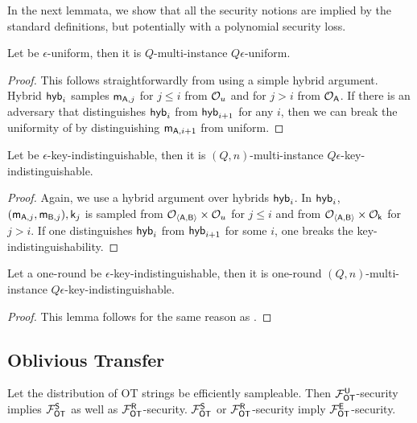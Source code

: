 In the next lemmata, we show that all the security notions are implied by the standard definitions, but potentially with a polynomial security loss.
 
\begin{lemma}\label{lem:multuniform}
Let \UKA be $\epsilon$-uniform, then it is $Q$-multi-instance $Q\epsilon$-uniform.
\end{lemma}
\begin{proof}
This follows straightforwardly from using a simple hybrid argument. Hybrid $\mathsf{hyb}_{i}$ samples $\mathsf{m}_{\mathsf{A},j}$ for $j\leq i$ from $\mathcal{O}_u$ and for $j>i$ from $\mathcal{O}_{\mathsf{A}}$. If there is an adversary that distinguishes $\mathsf{hyb}_i$ from $\mathsf{hyb}_{i+1}$ for any $i$, then we can break the uniformity of \UKA by distinguishing $\mathsf{m}_{\mathsf{A},i+1}$ from uniform.  
\pe
\end{proof}

\begin{lemma}\label{lem:keytomultkey}
Let \UKA be $\epsilon$-key-indistinguishable, then it is $(Q,n)$-multi-instance $Q\epsilon$-key-indistinguishable. 
\end{lemma}

\begin{proof}
Again, we use a hybrid argument over hybrids $\mathsf{hyb}_i$. In $\mathsf{hyb}_i$, $(\mathsf{m}_{\mathsf{A},j},\mathsf{m}_{\mathsf{B},j}),\mathsf{k}_j$ is sampled from $\mathcal{O}_{\langle \mathsf{A},\mathsf{B}\rangle}\times\mathcal{O}_u$ for $j\leq i$ and from $\mathcal{O}_{\langle \mathsf{A},\mathsf{B}\rangle}\times\mathcal{O}_\mathsf{k}$ for $j>i$. If one distinguishes $\mathsf{hyb}_i$ from $\mathsf{hyb}_{i+1}$ for some $i$, one breaks the key-indistinguishability. 
\pe
\end{proof}

\begin{lemma}\label{lem:oneroundkeytomultkey}
Let a one-round \UKA be $\epsilon$-key-indistinguishable, then it is one-round $(Q,n)$-multi-instance $Q\epsilon$-key-indistinguishable. 
\end{lemma}

\begin{proof}
This lemma follows for the same reason as .
\pe
\end{proof}


\subsection{Oblivious Transfer}\label{sec:addOT}


\begin{lemma}\label{lemma:is_a_repeat}
	Let the distribution of OT strings be efficiently sampleable. 
	Then $\mathcal{F}_{\mathsf{OT}}^\mathsf{U}$-security implies $\mathcal{F}_{\mathsf{OT}}^{\mathsf{S}}$ as well as $\mathcal{F}_{\mathsf{OT}}^\mathsf{R}$-security. $\mathcal{F}_{\mathsf{OT}}^{\mathsf{S}}$ or $\mathcal{F}_{\mathsf{OT}}^\mathsf{R}$-security imply $\mathcal{F}_{\mathsf{OT}}^\mathsf{E}$-security.
\end{lemma}


